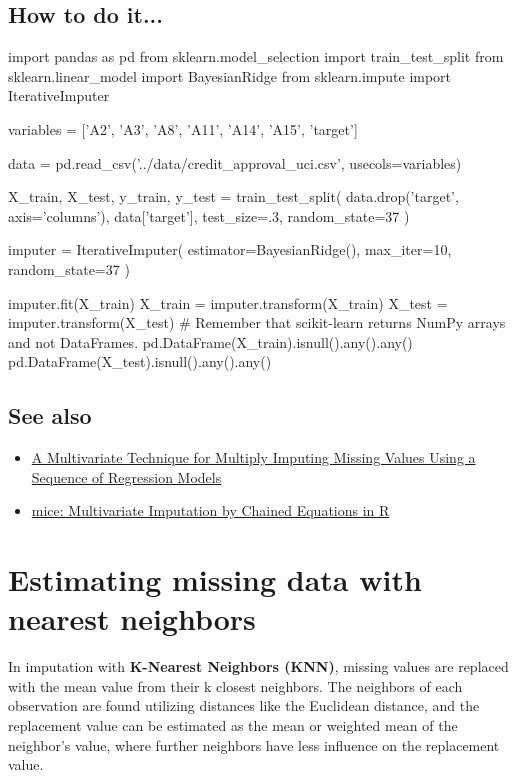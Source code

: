 \subsection{How to do it...}
\begin{pyc}
import pandas as pd
from sklearn.model_selection import train_test_split
from sklearn.linear_model import BayesianRidge
from sklearn.impute import IterativeImputer

variables = ['A2', 'A3', 'A8', 'A11', 'A14', 'A15', 'target']

data = pd.read_csv('../data/credit_approval_uci.csv',
                   usecols=variables)

X_train, X_test, y_train, y_test = train_test_split(
    data.drop('target', axis='columns'), data['target'],
    test_size=.3, random_state=37
)

imputer = IterativeImputer(
    estimator=BayesianRidge(),
    max_iter=10, random_state=37
)

imputer.fit(X_train)
X_train = imputer.transform(X_train)
X_test = imputer.transform(X_test)
# Remember that scikit-learn returns NumPy arrays and not DataFrames.
pd.DataFrame(X_train).isnull().any().any()
pd.DataFrame(X_test).isnull().any().any()
\end{pyc}
\subsection{See also}

\begin{itemize}
    \item \href{https://www.researchgate.net/publication/244959137_A_Multivariate_Technique_for_Multiply_Imputing_Missing_Values_Using_a_Sequence_of_Regression_Models}{A Multivariate Technique for Multiply Imputing Missing Values Using a Sequence of Regression Models}
    \item \href{https://www.jstatsoft.org/article/view/v045i03}{mice: Multivariate Imputation by Chained Equations in R}
\end{itemize}

\section{Estimating missing data with nearest neighbors}
In imputation with \textbf{K-Nearest Neighbors (KNN)}, missing values are replaced with the mean value from their k closest neighbors. The neighbors of each observation are found utilizing distances like the Euclidean distance, and the replacement value can be estimated as the mean or weighted mean of the neighbor’s value, where further neighbors have less influence on the replacement value.
